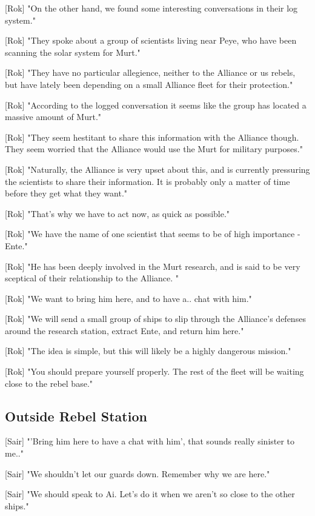 \documentclass[a4paper,12pt]{article}
\begin{document}
[Rok] "On the other hand, we found some interesting conversations in their log system."

[Rok] "They spoke about a group of scientists living near Peye, who have been scanning the solar system for Murt."

[Rok] "They have no particular allegience, neither to the Alliance or us rebels, but have lately been depending on a small
Alliance fleet for their protection."

[Rok] "According to the logged conversation it seems like the group has located a massive amount of Murt."

[Rok] "They seem hestitant to share this information with the Alliance though. They seem worried that the Alliance
would use the Murt for military purposes."

[Rok] "Naturally, the Alliance is very upset about this, and is currently pressuring the scientists to share their information. It is
probably only a matter of time before they get what they want."

[Rok] "That's why we have to act now, as quick as possible."

[Rok] "We have the name of one scientist that seems to be of high importance - Ente." 

[Rok] "He has been deeply involved in the Murt research, and is said to be very sceptical of their relationship to the Alliance. "

[Rok] "We want to bring him here, and to have a.. chat with him." 

[Rok] "We will send a small group of ships to slip through the Alliance's defenses around the research station, 
extract Ente, and return him here."

[Rok] "The idea is simple, but this will likely be a highly dangerous mission." 

[Rok] "You should prepare yourself properly. The rest of the fleet will be waiting close to the rebel base."

\subsection{Outside Rebel Station}

[Sair] "'Bring him here to have a chat with him', that sounds really sinister to me.." 

[Sair] "We shouldn't let our guards down. Remember why we are here." 

[Sair] "We should speak to Ai. Let's do it when we aren't so close to the other ships."
\end{document}
